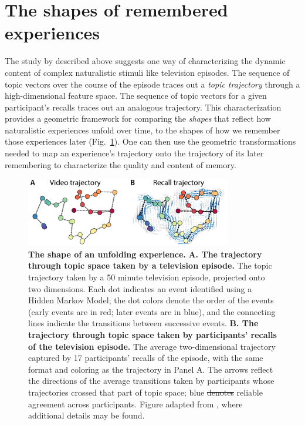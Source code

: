 \documentclass{article}
\providecommand{\DIFaddtex}[1]{{\protect\color{blue}\uwave{#1}}} %
\providecommand{\DIFdeltex}[1]{{\protect\color{red}\sout{#1}}}                      %
\providecommand{\DIFaddFL}[1]{\DIFadd{#1}} %
\providecommand{\DIFdelFL}[1]{\DIFdel{#1}} %
\providecommand{\DIFaddbeginFL}{} %
\providecommand{\DIFaddendFL}{} %
\providecommand{\DIFdelbeginFL}{} %
\providecommand{\DIFdelendFL}{} %
\providecommand{\DIFadd}[1]{\texorpdfstring{\DIFaddtex{#1}}{#1}} %
\providecommand{\DIFdel}[1]{\texorpdfstring{\DIFdeltex{#1}}{}} %
\newcommand{\DIFscaledelfig}{0.5}
\newlength{\DIFdelgraphicswidth} %
\newlength{\DIFdelgraphicsheight} %
\newcommand{\DIFaddincludegraphics}[2][]{{\color{blue}\fbox{\DIFOincludegraphics[#1]{#2}}}} %
\newcommand{\DIFdelincludegraphics}[2][]{%
\sbox{\DIFdelgraphicsbox}{\DIFOincludegraphics[#1]{#2}}%
\settoboxwidth{\DIFdelgraphicswidth}{\DIFdelgraphicsbox} %
\settoboxtotalheight{\DIFdelgraphicsheight}{\DIFdelgraphicsbox} %
\scalebox{\DIFscaledelfig}{%
\parbox[b]{\DIFdelgraphicswidth}{\usebox{\DIFdelgraphicsbox}\\[-\baselineskip] \rule{\DIFdelgraphicswidth}{0em}}\llap{\resizebox{\DIFdelgraphicswidth}{\DIFdelgraphicsheight}{%
\setlength{\unitlength}{\DIFdelgraphicswidth}%
\begin{picture}(1,1)%
\thicklines\linethickness{2pt} %
{\color[rgb]{1,0,0}\put(0,0){\framebox(1,1){}}}%
{\color[rgb]{1,0,0}\put(0,0){\line( 1,1){1}}}%
{\color[rgb]{1,0,0}\put(0,1){\line(1,-1){1}}}%
\end{picture}%
}\hspace*{3pt}}} %
} %
\DeclareRobustCommand{\DIFaddbeginFL}{\DIFOaddbeginFL \let\includegraphics\DIFaddincludegraphics} %
\DeclareRobustCommand{\DIFaddendFL}{\DIFOaddendFL \let\includegraphics\DIFOincludegraphics} %
\DeclareRobustCommand{\DIFdelbeginFL}{\DIFOdelbeginFL \let\includegraphics\DIFdelincludegraphics} %
\DeclareRobustCommand{\DIFdelendFL}{\DIFOaddendFL \let\includegraphics\DIFOincludegraphics} %
\begin{document}
\section*{The shapes of remembered experiences}
The study by \cite{HeusEtal18c} described above suggests one way of characterizing the dynamic content of complex naturalistic stimuli like television episodes.  The sequence of topic vectors over the course of the episode traces out a \textit{topic trajectory} through a high-dimensional feature space.  The sequence of topic vectors for a given participant's recalls traces out an analogous trajectory.  This characterization provides a geometric framework for comparing the \textit{shapes} that reflect how naturalistic experiences unfold over time, to the shapes of how we remember those experiences later (Fig.~\ref{fig:trajectories}).  One can then use the geometric transformations needed to map an experience's trajectory onto the trajectory of its later remembering to characterize the quality and content of memory.

\begin{figure}[tp]
\centering
\DIFdelbeginFL %
\DIFdelendFL \DIFaddbeginFL \includegraphics[width=0.8\textwidth]{figs/trajectory}
\DIFaddendFL \caption{\textbf{The shape of an unfolding experience.}  \textbf{A. The trajectory through topic space taken by a television episode.} The topic trajectory taken by a 50 minute television episode, projected onto two dimensions.  Each dot indicates an event identified using a Hidden Markov Model; the dot colors denote the order of the events (early events are in red; later events are in blue), and the connecting lines indicate the transitions between successive events.  \textbf{B. The trajectory through topic space taken by participants' recalls of the television episode.} The average two-dimensional trajectory captured by 17 participants' recalls of the episode, with the same format and coloring as the trajectory in Panel A. The arrows reflect the directions of the average transitions taken by participants whose trajectories crossed that part of topic space; blue \DIFdelbeginFL \DIFdelFL{denotes }\DIFdelendFL \DIFaddbeginFL \DIFaddFL{arrows denote directions of }\DIFaddendFL reliable agreement across participants.  Figure adapted from \cite{HeusEtal18c}, where additional details may be found.}
\label{fig:trajectories}
\end{figure}
\end{document}
